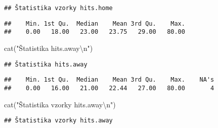 \documentclass[
]{article}
\newenvironment{Shaded}{\begin{snugshade}}{\end{snugshade}}
\newcommand{\FunctionTok}[1]{\textcolor[rgb]{0.00,0.00,0.00}{#1}}
\newcommand{\NormalTok}[1]{#1}
\newcommand{\SpecialCharTok}[1]{\textcolor[rgb]{0.00,0.00,0.00}{#1}}
\newcommand{\StringTok}[1]{\textcolor[rgb]{0.31,0.60,0.02}{#1}}
\begin{document}
\begin{verbatim}
## Štatistika vzorky hits.home
\end{verbatim}

\begin{Shaded}
\end{Shaded}

\begin{verbatim}
##    Min. 1st Qu.  Median    Mean 3rd Qu.    Max. 
##    0.00   18.00   23.00   23.75   29.00   80.00
\end{verbatim}

\begin{Shaded}
\begin{Highlighting}[]
\FunctionTok{cat}\NormalTok{(}\StringTok{"Štatistika hits.away}\SpecialCharTok{\textbackslash{}n}\StringTok{"}\NormalTok{)}
\end{Highlighting}
\end{Shaded}

\begin{verbatim}
## Štatistika hits.away
\end{verbatim}

\begin{Shaded}
\end{Shaded}

\begin{verbatim}
##    Min. 1st Qu.  Median    Mean 3rd Qu.    Max.    NA's 
##    0.00   16.00   21.00   22.44   27.00   80.00       4
\end{verbatim}

\begin{Shaded}
\begin{Highlighting}[]
\FunctionTok{cat}\NormalTok{(}\StringTok{"Štatistika vzorky hits.away}\SpecialCharTok{\textbackslash{}n}\StringTok{"}\NormalTok{)}
\end{Highlighting}
\end{Shaded}

\begin{verbatim}
## Štatistika vzorky hits.away
\end{verbatim}

\begin{Shaded}
\end{Shaded}
\end{document}

